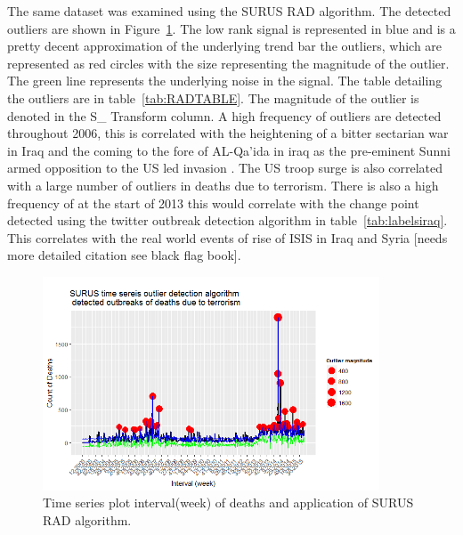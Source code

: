 The same dataset was examined using the SURUS RAD algorithm. The detected outliers are shown in Figure~\ref{fig:tseriessurusrad}. The low rank signal is represented in blue and is a pretty decent approximation of the underlying trend bar the outliers, which are represented as red circles with the size representing the magnitude of the outlier. The green line represents the underlying noise in the signal. The table detailing the outliers are in table~\ref{tab:RADTABLE}. The magnitude of the outlier is denoted in the S\_ Transform column. A high frequency of outliers are detected throughout 2006, this is correlated with the heightening of a bitter sectarian war in Iraq and the coming to the fore of AL-Qa'ida in iraq as the pre-eminent Sunni armed opposition to the US led invasion \citep{fearon2007iraq}. The US troop surge \citep{ricks2009gamble} is also correlated with a large number of outliers in deaths due to terrorism. There is also a high frequency of at the start of 2013 this would correlate with the change point detected using the twitter outbreak detection algorithm in table~\ref{tab:labelsiraq}. This correlates with the real world events of rise of ISIS in Iraq and Syria [needs more detailed citation see black flag book].


\begin{figure}[t]
\includegraphics[width=10cm]{Peters_experiment_markdown_files/figure-latex/Surus_Rad_iraq.png}
\caption{Time series plot interval(week) of deaths and application of SURUS RAD algorithm.}
\label{fig:tseriessurusrad}
\centering
\end{figure}

